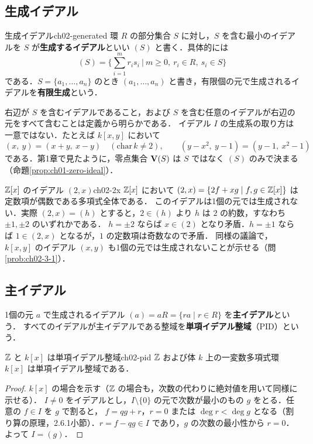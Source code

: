 \subsection{生成イデアル}

\begin{mydef}{生成イデアル}{ch02-generated}
環 $R$ の部分集合 $S$ に対し，$S$ を含む最小のイデアルを $S$ が\textbf{生成するイデアル}といい $(S)$ と書く．具体的には
\[
  (S)=\Big\{\sum_{i=1}^m r_is_i\ \Big|\ m\ge0,\ r_i\in R,\ s_i\in S\Big\}
\]
である．$S=\{a_1,\dots,a_n\}$ のとき $(a_1,\dots,a_n)$ と書き，有限個の元で生成されるイデアルを\textbf{有限生成}という．
\end{mydef}

右辺が $S$ を含むイデアルであること，および $S$ を含む任意のイデアルが右辺の元をすべて含むことは定義から明らかである．
イデアル $I$ の生成系の取り方は一意ではない．たとえば $k[x,y]$ において
\[
  (x,\ y)=(x+y,\ x-y)\quad(\mathrm{char}\,k\ne2),\qquad (y-x^2,\ y-1)=(y-1,\ x^2-1)
\]
である．第1章で見たように，零点集合 $\mathbf{V}(S)$ は $S$ ではなく $(S)$ のみで決まる（命題\ref{prop:ch01-zero-ideal}）．

\begin{myex}{$\mathbb{Z}[x]$ のイデアル $(2,x)$}{ch02-2x}
$\mathbb{Z}[x]$ において $(2,x)=\{2f+xg\mid f,g\in\mathbb{Z}[x]\}$ は定数項が偶数である多項式全体である．
このイデアルは1個の元では生成されない．実際 $(2,x)=(h)$ とすると，$2\in(h)$ より $h$ は $2$ の約数，すなわち $\pm1,\pm2$ のいずれかである．
$h=\pm2$ ならば $x\in(2)$ となり矛盾．$h=\pm1$ ならば $1\in(2,x)$ となるが，$1$ の定数項は奇数なので矛盾．
同様の議論で，$k[x,y]$ のイデアル $(x,y)$ も1個の元では生成されないことが示せる（問\ref{prob:ch02-3-1}）．
\end{myex}

\subsection{主イデアル}

1個の元 $a$ で生成されるイデアル $(a)=aR=\{ra\mid r\in R\}$ を\textbf{主イデアル}という．
すべてのイデアルが主イデアルである整域を\textbf{単項イデアル整域}（PID）という．

\begin{mythm}{$\mathbb{Z}$ と $k[x]$ は単項イデアル整域}{ch02-pid}
$\mathbb{Z}$ および体 $k$ 上の一変数多項式環 $k[x]$ は単項イデアル整域である．
\end{mythm}

\begin{proof}
$k[x]$ の場合を示す（$\mathbb{Z}$ の場合も，次数の代わりに絶対値を用いて同様に示せる）．
$I\ne0$ をイデアルとし，$I\setminus\{0\}$ の元で次数が最小のもの $g$ をとる．任意の $f\in I$ を $g$ で割ると，
$f=qg+r$，$r=0$ または $\deg r<\deg g$ となる（割り算の原理，2.6.1小節）．$r=f-qg\in I$ であり，$g$ の次数の最小性から $r=0$．
よって $I=(g)$．
\end{proof}


